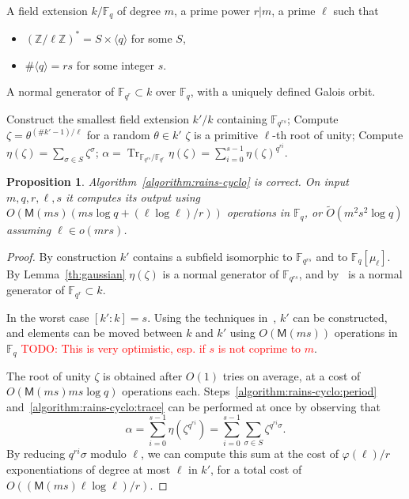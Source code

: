 \documentclass[12pt]{article}
\theoremstyle{plain}
\newtheorem{proposition}[theorem]{Proposition}
\theoremstyle{definition}
\newcommand{\tildO}{\tilde{O}}
\newcommand{\todo}[1]{\textcolor{red}{TODO: #1}}
\DeclareMathOperator{\trace}{Tr} %
\def\Z{\ensuremath{\mathbb{Z}}}
\def\F{\ensuremath{\mathbb{F}}}
\def\MM{\ensuremath{\mathsf{M}}}
\def\euler{\ensuremath{\varphi}}
\newcounter{algorithm}
\begin{document}
\begin{algorithm}
  \label{algorithm:rains-cyclo}
  \begin{algorithmic}[1]
    \REQUIRE A field extension $k/\F_q$ of degree $m$, a prime power
    $r|m$, a prime $\ell$ such that
    \begin{itemize}
    \item $(\Z/\ell\Z)^\ast = S \times \langle q\rangle$ for some $S$,
    \item $\#\langle q\rangle = rs$ for some integer $s$.
    \end{itemize}
    \ENSURE A normal generator of $\F_{q^r}\subset k$ over $\F_q$,
    with a uniquely defined Galois orbit.
    
    \STATE Construct the smallest field extension $k'/k$
    containing $\F_{q^{rs}}$; 
    \REPEAT
    \STATE Compute $\zeta = \theta^{(\#k'-1)/\ell}$ for a random $\theta\in k'$
    \UNTIL $\zeta$ is a primitive $\ell$-th root of unity;
    \STATE\label{algorithm:rains-cyclo:period} Compute $\eta(\zeta) = \sum_{\sigma\in S}\zeta^\sigma$;
    \RETURN\label{algorithm:rains-cyclo:trace} $\alpha = \trace_{\F_{q^{rs}}/\F_{q^r}}\eta(\zeta) = \sum_{i=0}^{s-1}\eta(\zeta)^{q^{ri}}$.
  \end{algorithmic}
\end{algorithm}

\begin{proposition}
  Algorithm~\ref{algorithm:rains-cyclo} is correct. On input
  $m,q,r,\ell,s$ it computes its output using $O(\MM(ms)(ms\log q +
  (\ell\log\ell)/r))$ operations in $\F_q$, or $\tildO(m^2s^2\log q)$
  assuming $\ell\in o(mrs)$.
\end{proposition}
\begin{proof}
  By construction $k'$ contains a subfield isomorphic to $\F_{q^{rs}}$
  and to $\F_q[\mu_\ell]$. By Lemma~\ref{th:gaussian} $\eta(\zeta)$ is
  a normal generator of $\F_{q^{rs}}$, and
  by~\cite[Prop.~5.2.3.1]{mullen2013handbook} is a normal generator of
  $\F_{q^r}\subset k$.

  In the worst case $[k':k]=s$. Using the techniques
  in~\cite{couveignes+lercier11,DeDoSc13,DeFeo:2014:FAA:2608628.2608672},
  $k'$ can be constructed, and elements can be moved between $k$ and
  $k'$ using $O(\MM(ms))$ operations in $\F_q$ \todo{This is very
    optimistic, esp. if $s$ is not coprime to $m$}.

  The root of unity $\zeta$ is obtained after $O(1)$ tries on average,
  at a cost of $O(\MM(ms)ms\log q)$ operations each.
  Steps~\ref{algorithm:rains-cyclo:period}
  and~\ref{algorithm:rains-cyclo:trace} can be performed at once by
  observing that
  \[\alpha = \sum_{i=0}^{s-1}\eta(\zeta^{q^{ri}})= \sum_{i=0}^{s-1}\sum_{\sigma\in S}\zeta^{q^{ri}\sigma}.\]
  By reducing $q^{ri}\sigma$ modulo $\ell$, we can compute this sum at
  the cost of $\euler(\ell)/r$ exponentiations of degree at most
  $\ell$ in $k'$, for a total cost of $O((\MM(ms)\ell\log\ell)/r)$.
\end{proof}
\end{document}
